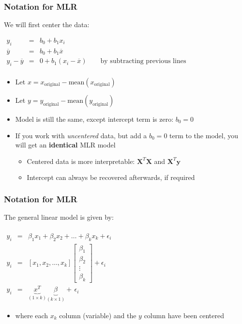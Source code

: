 \begin{frame}\frametitle{Notation for MLR}
	
	We will first center the data:
	
	$ 
	\begin{array}{rcl}
		y_i &=& b_0 + b_1 x_i \\
		\overline{y} &=& b_0 + b_1 \overline{x} \\
		y_i - \overline{y} &=& 0 +b_1(x_i - \overline{x}) \qquad \text{by subtracting previous lines} \\
	\end{array}
	$
	\begin{itemize}
		\item	Let $x = x_\text{original} - \text{mean}\left(x_\text{original} \right)$ 
		\item	Let $y = y_\text{original} - \text{mean}\left(y_\text{original} \right)$ 
		\item	Model is still the same, except intercept term is zero: $b_0 = 0$ 
	\end{itemize}
	\begin{itemize}
		\item	If you work with \emph{uncentered} data, but add a $b_0 = 0$ term to the model, you will get an \textbf{identical} MLR model 
		\begin{itemize}
			\item	Centered data is more interpretable: $\mathbf{X}^T\mathbf{X}$ and $\mathbf{X}^T\mathbf{y}$ 
			\item	Intercept can always be recovered afterwards, if required 
		\end{itemize}
	\end{itemize}
\end{frame}

\begin{frame}\frametitle{Notation for MLR}
	
	The general linear model is given by:
	
	$ 
	\begin{array}{rcl}
		\\
		y_i &=& \beta_1 x_1 + \beta_2x_2 + \ldots + \beta_kx_k + \epsilon_i \\
		y_i &=& [x_1, x_2, \ldots, x_k] 
		\begin{bmatrix}
			\beta_1 \\
			\beta_2 \\
			\vdots \\
			\beta_k 
		\end{bmatrix}
		+ \epsilon_i \\
		y_i &=& \underbrace{\mathit{x}^T}_{(1 \times k)} \underbrace{\beta}_{(k \times 1)} + \,\epsilon_i 
	\end{array}
	$
	\begin{itemize}
		\item	where each $x_k$ column (variable) and the $y$ column have been centered 
	\end{itemize}
\end{frame}

